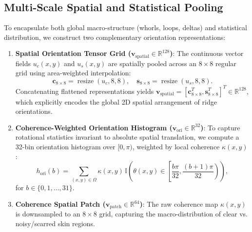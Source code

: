 \documentclass[lettersize,journal]{IEEEtran}
\begin{document}
\subsection{Multi-Scale Spatial and Statistical Pooling}
To encapsulate both global macro-structure (whorls, loops, deltas) and statistical distribution, we construct two complementary orientation representations:
\begin{enumerate}
    \item \textbf{Spatial Orientation Tensor Grid ($\mathbf{v}_{\text{spatial}} \in \mathbb{R}^{128}$)}: The continuous vector fields $u_c(x, y)$ and $u_s(x, y)$ are spatially pooled across an $8 \times 8$ regular grid using area-weighted interpolation:
    \begin{equation}
        \mathbf{c}_{8 \times 8} = \operatorname{resize}(u_c, 8, 8), \quad \mathbf{s}_{8 \times 8} = \operatorname{resize}(u_s, 8, 8).
    \end{equation}
    Concatenating flattened representations yields $\mathbf{v}_{\text{spatial}} = [\mathbf{c}_{8 \times 8}^T, \mathbf{s}_{8 \times 8}^T]^T \in \mathbb{R}^{128}$, which explicitly encodes the global 2D spatial arrangement of ridge orientations.
    \item \textbf{Coherence-Weighted Orientation Histogram ($\mathbf{v}_{\text{ori}} \in \mathbb{R}^{32}$)}: To capture rotational statistics invariant to absolute spatial translation, we compute a 32-bin orientation histogram over $[0, \pi)$, weighted by local coherence $\kappa(x, y)$:
    \begin{equation}
        h_{\text{ori}}(b) = \sum_{(x, y) \in \Omega} \kappa(x, y) \, \mathbb{I}\left( \theta(x, y) \in \left[\frac{b\pi}{32}, \frac{(b+1)\pi}{32}\right) \right),
    \end{equation}
    for $b \in \{0, 1, \dots, 31\}$.
    \item \textbf{Coherence Spatial Patch ($\mathbf{v}_{\text{patch}} \in \mathbb{R}^{64}$)}: The raw coherence map $\kappa(x, y)$ is downsampled to an $8 \times 8$ grid, capturing the macro-distribution of clear vs. noisy/scarred skin regions.
\end{enumerate}
\end{document}
